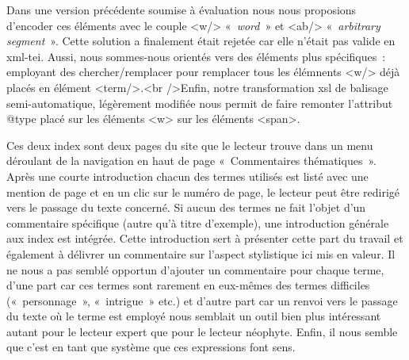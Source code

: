 \documentclass[12pt, a4paper]{article}
\begin{document}
Dans une version précédente soumise à évaluation nous nous proposions d'encoder ces éléments avec le couple <w/> «~\textit{word}~» et <ab/> «~\textit{arbitrary segment}~». Cette solution a finalement était rejetée car elle n'était pas valide en xml-tei. Aussi, nous sommes-nous orientés vers des éléments plus spécifiques~: employant des chercher/remplacer pour remplacer tous les élémnents <w/> déjà placés en élément <term/>.<br />Enfin, notre transformation xsl de balisage semi-automatique, légèrement modifiée nous permit de faire remonter l'attribut @type placé sur les éléments <w> sur les éléments <span>.


Ces deux index sont deux pages du site que le lecteur trouve dans un menu déroulant de la navigation en haut de page «~Commentaires thématiques~». Après une courte introduction chacun des termes utilisés est listé avec une mention de page et en un clic sur le numéro de page, le lecteur peut être redirigé vers le passage du texte concerné. Si aucun des termes ne fait l'objet d'un commentaire spécifique (autre qu'à titre d'exemple), une introduction générale aux index est intégrée. Cette introduction sert à présenter cette part du travail et également à délivrer un commentaire sur l'aspect stylistique ici mis en valeur. Il ne nous a pas semblé opportun d'ajouter un commentaire pour chaque terme, d'une part car ces termes sont rarement en eux-mêmes des termes difficiles («~personnage~», «~intrigue~» etc.) et d'autre part car un renvoi vers le passage du texte où le terme est employé nous semblait un outil bien plus intéressant autant pour le lecteur expert que pour le lecteur néophyte. Enfin, il nous semble que c'est en tant que système que ces expressions font sens. 
\end{document}
